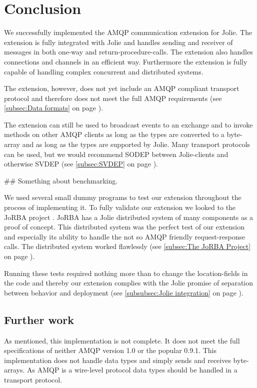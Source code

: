 \section{Conclusion}
We successfully implemented the AMQP communication extension for Jolie. The extension is fully integrated with Jolie and handles sending and receiver of messages in both one-way and return-procedure-calls. The extension also handles connections and channels in an efficient way. Furthermore the extension is fully capable of handling complex concurrent and distributed systems.

The extension, however, does not yet include an AMQP compliant transport protocol and therefore does not meet the full AMQP requirements (see \ref{subsec:Data formats} on page \pageref{subsec:Data formats}).

The extension can still be used to broadcast events to an exchange and to invoke methods on other AMQP clients as long as the types are converted to a byte-array and as long as the types are supported by Jolie. Many transport protocols can be used, but we would recommend SODEP between Jolie-clients and otherwise SVDEP (see \ref{subsec:SVDEP} on page \pageref{subsec:SVDEP}).

\#\# Something about benchmarking.

We used several small dummy programs to test our extension throughout the process of implementing it. To fully validate our extension we looked to the JoRBA project \cite{Jorba}. JoRBA has a Jolie distributed system of many components as a proof of concept. This distributed system was the perfect test of our extension and especially its ability to handle the not so AMQP friendly request-response calls. The distributed system worked flawlessly (see \ref{subsec:The JoRBA Project} on page \pageref{subsec:The JoRBA Project}).

Running these tests required nothing more than to change the location-fields in the code and thereby our extension complies with the Jolie promise of separation between behavior and deployment (see \ref{subsubsec:Jolie integration} on page \pageref{subsubsec:Jolie integration}).
\subsection{Further work}
As mentioned, this implementation is not complete. It does not meet the full specifications of neither AMQP version 1.0 or the popular 0.9.1. This implementation does not handle data types and simply sends and receives byte-arrays. As AMQP is a wire-level protocol data types should be handled in a transport protocol.
\newpage